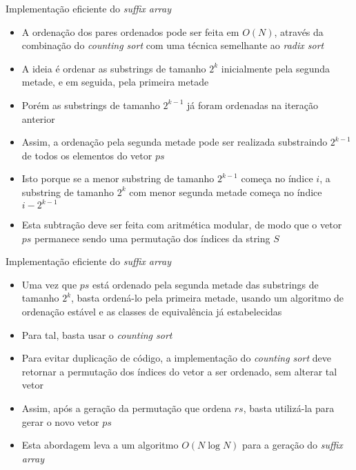\begin{frame}[fragile]{Implementação eficiente do {\it suffix array}}

    \begin{itemize}
        \item A ordenação dos pares ordenados pode ser feita em $O(N)$, através da combinação
            do {\it counting sort} com uma técnica semelhante ao {\it radix sort}

        \item A ideia é ordenar as substrings de tamanho $2^k$ inicialmente pela segunda metade, 
            e em seguida, pela primeira metade

        \item Porém as substrings de tamanho $2^{k - 1}$ já foram ordenadas na iteração anterior

        \item Assim, a ordenação pela segunda metade pode ser realizada substraindo
            $2^{k - 1}$ de todos os elementos do vetor $ps$

        \item Isto porque se a menor substring de tamanho $2^{k - 1}$ começa no índice $i$, a
            substring de tamanho $2^k$ com menor segunda metade começa no índice $i - 2^{k - 1}$

        \item Esta subtração deve ser feita com aritmética modular, de modo que o vetor $ps$
            permanece sendo uma permutação dos índices da string $S$
    \end{itemize}

\end{frame}

\begin{frame}[fragile]{Implementação eficiente do {\it suffix array}}

    \begin{itemize}
        \item Uma vez que $ps$ está ordenado pela segunda metade das substrings de tamanho $2^k$,
            basta ordená-lo pela primeira metade, usando um algoritmo de ordenação estável e 
            as classes de equivalência já estabelecidas

        \item Para tal, basta usar o \textit{counting sort}

        \item Para evitar duplicação de código, a implementação do \textit{counting sort} deve
            retornar a permutação dos índices do vetor a ser ordenado, sem alterar tal vetor

        \item Assim, após a geração da permutação que ordena $rs$, basta utilizá-la para gerar
            o novo vetor $ps$
                
        \item Esta abordagem leva a um algoritmo $O(N\log N)$ para a geração do \textit{suffix
            array}
    \end{itemize}

\end{frame}

